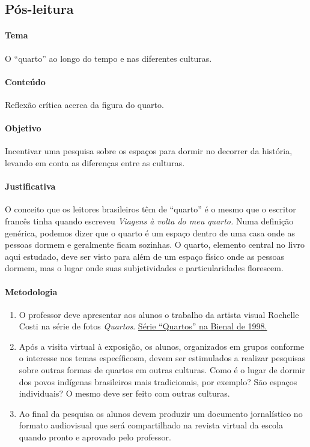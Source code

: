 \documentclass[12pt]{extarticle}
\begin{document}
\subsection{Pós-leitura}


\paragraph{Tema} O ``quarto'' ao longo do tempo e nas diferentes culturas.

\paragraph{Conteúdo} Reflexão crítica acerca da figura do quarto.

\paragraph{Objetivo} Incentivar uma pesquisa sobre os espaços para dormir 
no decorrer da história, levando em conta as diferenças entre as culturas.

\paragraph{Justificativa} O conceito que os leitores brasileiros
têm de ``quarto'' é o mesmo que o escritor francês tinha 
quando escreveu \emph{Viagens à volta do meu quarto.} Numa definição genérica,
podemos dizer que o quarto é um espaço dentro de uma casa onde as pessoas dormem
e geralmente ficam sozinhas. 
O quarto, elemento central no livro aqui estudado, deve ser visto
para além de um espaço físico onde as pessoas dormem,
mas o lugar onde suas subjetividades e particularidades florescem.  

\paragraph{Metodologia}
\begin{enumerate}
	\item
	O professor deve apresentar aos alunos o trabalho da artista visual Rochelle Costi
	na série de fotos \emph{Quartos}. \href{http://www.24bienal.org.br/bra/ebraentcost01.htm}{Série ``Quartos'' na Bienal de 1998.}

	\item
	Após a visita virtual à exposição, os alunos, organizados em grupos conforme o interesse
	nos temas específicosm, devem ser estimulados a realizar pesquisas
	sobre outras formas de quartos em outras culturas. Como é o lugar de dormir 
	dos povos indígenas brasileiros mais tradicionais, por exemplo? São espaços individuais?
	O mesmo deve ser feito com outras culturas.

	\item
	Ao final da pesquisa os alunos devem produzir um documento jornalístico no formato
	audiovisual que será compartilhado na revista virtual da escola quando pronto e 
	aprovado pelo professor.
\end{enumerate}
\end{document}
